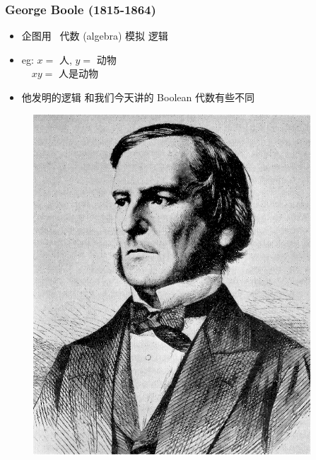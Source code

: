 \documentclass[17pt]{beamer}
\begin{document}
\begin{frame}
\frametitle{George Boole (1815-1864)}
\fontsize{16}{16}\selectfont
\begin{minipage}[t]{0.6\linewidth}
	\begin{itemize}
		\item 企图用 {\color{red} \ 代数} (algebra) 模拟 逻辑
		\item eg: $x =$ 人, $y =$ 动物 \\
		$\quad xy =$ 人是动物
		\item 他发明的逻辑 和我们今天讲的 Boolean 代数有些不同
	\end{itemize}
\end{minipage}
\hfill
\begin{minipage}[t]{0.35\linewidth}
	\begin{figure}[H]
		\includegraphics[scale=1.0]{Boole.jpg}
	\end{figure}
\end{minipage}
\end{frame}
\end{document}
